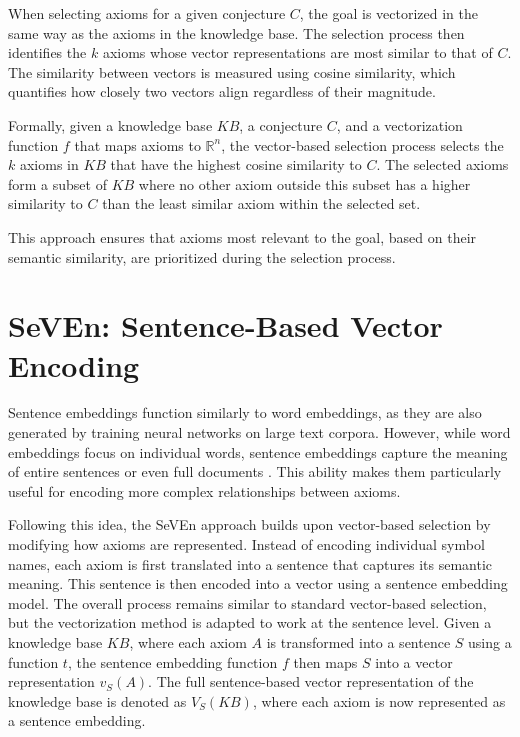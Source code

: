 \documentclass[english,version-2020-11]{uzl-thesis}
\begin{document}
When selecting axioms for a given conjecture \( C \), the goal is vectorized in the same way as the axioms in the knowledge base. The selection process then identifies the \( k \) axioms whose vector representations are most similar to that of \( C \). The similarity between vectors is measured using cosine similarity, which quantifies how closely two vectors align regardless of their magnitude.

Formally, given a knowledge base \( KB \), a conjecture \( C \), and a vectorization function \( f \) that maps axioms to \( \mathbb{R}^n \), the vector-based selection process selects the \( k \) axioms in \( KB \) that have the highest cosine similarity to \( C \). The selected axioms form a subset of \( KB \) where no other axiom outside this subset has a higher similarity to \( C \) than the least similar axiom within the selected set.

This approach ensures that axioms most relevant to the goal, based on their semantic similarity, are prioritized during the selection process.

\section{SeVEn: Sentence-Based Vector Encoding}

Sentence embeddings function similarly to word embeddings, as they are also generated by training neural networks on large text corpora. However, while word embeddings focus on individual words, sentence embeddings capture the meaning of entire sentences or even full documents \cite{Kiros2015SkipThought}. This ability makes them particularly useful for encoding more complex relationships between axioms.

Following this idea, the SeVEn approach builds upon vector-based selection by modifying how axioms are represented. Instead of encoding individual symbol names, each axiom is first translated into a sentence that captures its semantic meaning. This sentence is then encoded into a vector using a sentence embedding model. The overall process remains similar to standard vector-based selection, but the vectorization method is adapted to work at the sentence level. Given a knowledge base \( KB \), where each axiom \( A \) is transformed into a sentence \( S \) using a function \( t \), the sentence embedding function \( f \) then maps \( S \) into a vector representation \( v_S(A) \). The full sentence-based vector representation of the knowledge base is denoted as \( V_S(KB) \), where each axiom is now represented as a sentence embedding.
\end{document}
